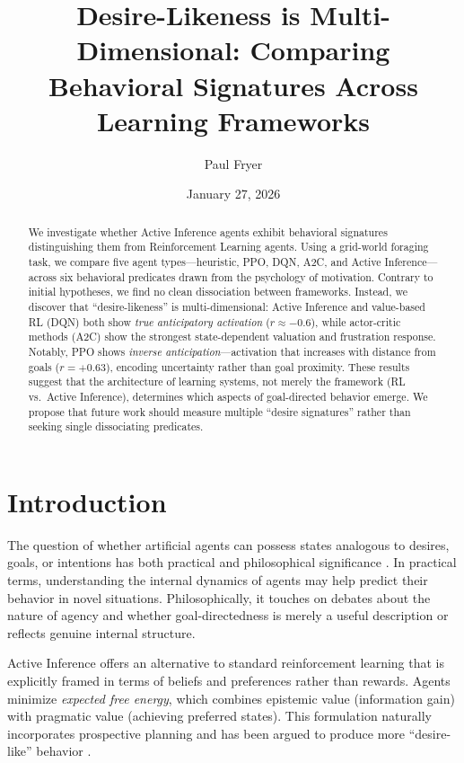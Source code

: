 \documentclass{article}
\title{Desire-Likeness is Multi-Dimensional: Comparing Behavioral Signatures Across Learning Frameworks}
\author{%
  Paul Fryer
}
\date{January 27, 2026}
\begin{document}
\maketitle

\begin{abstract}
We investigate whether Active Inference agents exhibit behavioral signatures distinguishing them from Reinforcement Learning agents. Using a grid-world foraging task, we compare five agent types---heuristic, PPO, DQN, A2C, and Active Inference---across six behavioral predicates drawn from the psychology of motivation. Contrary to initial hypotheses, we find no clean dissociation between frameworks. Instead, we discover that ``desire-likeness'' is multi-dimensional: Active Inference and value-based RL (DQN) both show \textit{true anticipatory activation} ($r \approx -0.6$), while actor-critic methods (A2C) show the strongest state-dependent valuation and frustration response. Notably, PPO shows \textit{inverse anticipation}---activation that increases with distance from goals ($r = +0.63$), encoding uncertainty rather than goal proximity. These results suggest that the architecture of learning systems, not merely the framework (RL vs.\ Active Inference), determines which aspects of goal-directed behavior emerge. We propose that future work should measure multiple ``desire signatures'' rather than seeking single dissociating predicates.
\end{abstract}

\section{Introduction}

The question of whether artificial agents can possess states analogous to desires, goals, or intentions has both practical and philosophical significance \cite{dennett1987intentional, bratman1987intention}. In practical terms, understanding the internal dynamics of agents may help predict their behavior in novel situations. Philosophically, it touches on debates about the nature of agency and whether goal-directedness is merely a useful description or reflects genuine internal structure.

Active Inference \cite{friston2010free, parr2022active} offers an alternative to standard reinforcement learning that is explicitly framed in terms of beliefs and preferences rather than rewards. Agents minimize \textit{expected free energy}, which combines epistemic value (information gain) with pragmatic value (achieving preferred states). This formulation naturally incorporates prospective planning and has been argued to produce more ``desire-like'' behavior \cite{seth2021being}.
\end{document}
